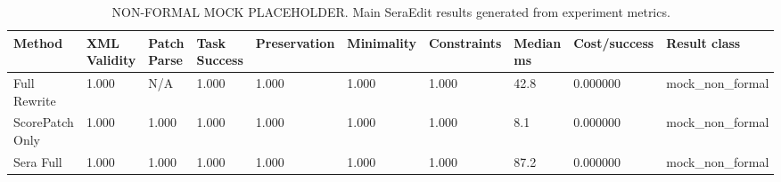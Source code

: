 \begin{table}[t]
\centering
\caption{NON-FORMAL MOCK PLACEHOLDER. Main SeraEdit results generated from experiment metrics.}
\small
\begin{tabular}{llllllllll}
\hline
Method & XML Validity & Patch Parse & Task Success & Preservation & Minimality & Constraints & Median ms & Cost/success & Result class \\
\hline
Full Rewrite & 1.000 & N/A & 1.000 & 1.000 & 1.000 & 1.000 & 42.8 & 0.000000 & mock\_non\_formal \\
ScorePatch Only & 1.000 & 1.000 & 1.000 & 1.000 & 1.000 & 1.000 & 8.1 & 0.000000 & mock\_non\_formal \\
Sera Full & 1.000 & 1.000 & 1.000 & 1.000 & 1.000 & 1.000 & 87.2 & 0.000000 & mock\_non\_formal \\
\hline
\end{tabular}
\end{table}
